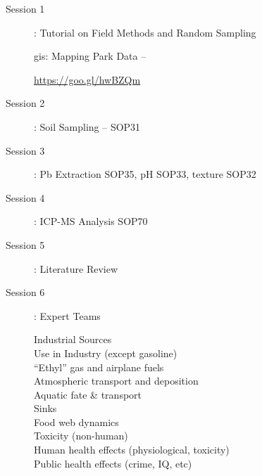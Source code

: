 \documentclass{article}\usepackage[]{graphicx}\usepackage[]{color}
\begin{document}
\begin{description}

\item[Session 1]: Tutorial on Field Methods and Random Sampling


gis: Mapping Park Data -- 

\url{https://goo.gl/hwBZQm}

\item[Session 2]: Soil Sampling -- SOP31

\item[Session 3]: Pb Extraction SOP35, pH SOP33, texture SOP32

\item[Session 4]: ICP-MS Analysis SOP70

\item[Session 5]: Literature Review 

\item[Session 6]: Expert Teams

\begin{description}
  \item[Industrial Sources]
  \item[Use in Industry (except gasoline)]
  \item[``Ethyl'' gas and airplane fuels] 
  \item[Atmospheric transport and deposition]
  \item[Aquatic fate \& transport] 
  \item[Sinks] 
  \item[Food web dynamics] 
  \item[Toxicity (non-human)] 
  \item[Human health effects (physiological, toxicity)] 
  \item[Public health effects (crime, IQ, etc)]
\end{description}



\end{description}
\end{document}
